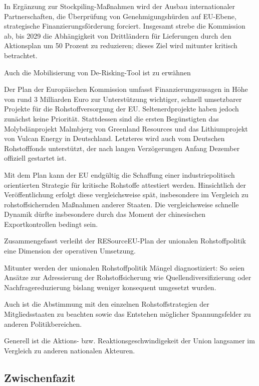 \documentclass[12pt,a4paper,oneside]{book} %
\begin{document}
In Ergänzung zur Stockpiling-Maßnahmen wird der Ausbau internationaler Partnerschaften, die Überprüfung von Genehmigungshürden auf EU-Ebene, strategische Finanzierungsförderung forciert. Insgesamt strebe die Kommission ab, bis 2029 die Abhängigkeit von Drittländern für Lieferungen durch den Aktionsplan um 50 Prozent zu reduzieren; dieses Ziel wird mitunter kritisch betrachtet.\autocite{https://www.ft.com/content/66dbc507-74e2-4d05-b1f1-b9dfbc8a5399?shareType=nongift}

Auch die Mobilisierung von De-Risking-Tool ist zu erwähnen

Der Plan der Europäischen Kommission umfasst Finanzierungszusagen in Höhe von rund 3 Milliarden Euro zur Unterstützung wichtiger, schnell umsetzbarer Projekte für die Rohstoffversorgung der EU. Seltenerdprojekte haben jedoch zunächst keine Priorität. Stattdessen sind die ersten Begünstigten das Molybdänprojekt Malmbjerg von Greenland Resources und das Lithiumprojekt von Vulcan Energy in Deutschland. Letzteres wird auch vom Deutschen Rohstofffonds unterstützt, der nach langen Verzögerungen Anfang Dezember offiziell gestartet ist.

Mit dem Plan kann der EU endgültig die Schaffung einer industriepolitisch orientierten Strategie für kritische Rohstoffe attestiert werden. Hinsichtlich der Veröffentlichung erfolgt diese vergleichsweise spät, insbesondere im Vergleich zu rohstoffsichernden Maßnahmen anderer Staaten.
Die vergleichsweise schnelle Dynamik dürfte insbesondere durch das Moment der chinesischen Exportkontrollen bedingt sein.

Zusammengefasst verleiht der RESourceEU-Plan der unionalen Rohstoffpolitik eine Dimension der operativen Umsetzung.\autocite{ESG 2025, 449, 451}

Mitunter werden der unionalen Rohstoffpolitik Mängel diagnostiziert: So seien Ansätze zur Adressierung der Rohstoffsicherung wie Quellendiversifizierung oder Nachfragereduzierung bislang weniger konsequent umgesetzt wurden.\autocite{IW-Trends_2026-2-6_Neligan_et_al_Rohstoffe S. 112}

Auch ist die Abstimmung mit den einzelnen Rohstoffstrategien der Mitgliedsstaaten zu beachten sowie das Entstehen möglicher Spannungsfelder zu anderen Politikbereichen.\autocite{Rohstoffsituation der bayerischen Wirtschaft, 2025, S. 52}


Generell ist die Aktions- bzw. Reaktionsgeschwindigekeit der Union langsamer im Vergleich zu anderen nationalen Akteuren.

\subsection{Zwischenfazit}
\end{document}
